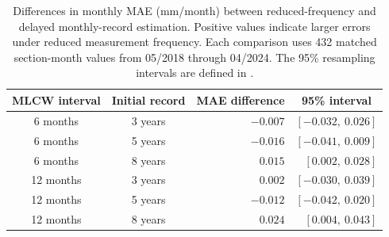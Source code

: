 \begin{table}[H]
  \centering
  \small
  \renewcommand{\arraystretch}{1.15}
  \caption[Paired monthly-MAE differences between reduced-frequency and delayed MLCW estimation.]{Differences in monthly MAE (mm/month) between reduced-frequency and delayed monthly-record estimation. Positive values indicate larger errors under reduced measurement frequency. Each comparison uses 432 matched section-month values from 05/2018 through 04/2024. The 95\% resampling intervals are defined in .}
  \label{tab:supp_reduced_frequency_vs_delayed}
  \begin{tabular}{c|c|r|r}
    \toprule
    \multicolumn{1}{c|}{\textbf{MLCW interval}} & \multicolumn{1}{c|}{\textbf{Initial record}} & \multicolumn{1}{c|}{\textbf{MAE difference}} & \multicolumn{1}{c}{\textbf{95\% interval}} \\
    \midrule
    6 months & 3 years & $-0.007$ & $[-0.032,\ 0.026]$ \\
    6 months & 5 years & $-0.016$ & $[-0.041,\ 0.009]$ \\
    6 months & 8 years & $0.015$ & $[0.002,\ 0.028]$ \\
    12 months & 3 years & $0.002$ & $[-0.030,\ 0.039]$ \\
    12 months & 5 years & $-0.012$ & $[-0.042,\ 0.020]$ \\
    12 months & 8 years & $0.024$ & $[0.004,\ 0.043]$ \\
    \bottomrule
  \end{tabular}
\end{table}

